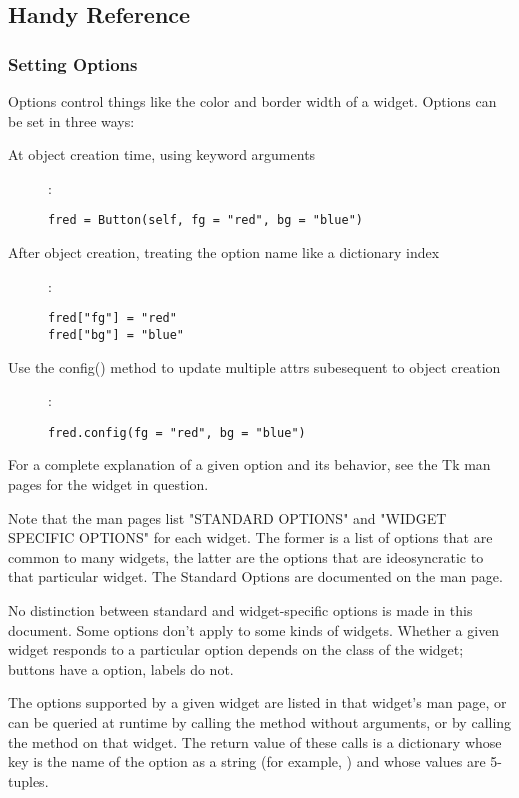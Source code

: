 \subsection{Handy Reference}

\subsubsection{Setting Options
               \label{tkinter-setting-options}}

Options control things like the color and border width of a widget.
Options can be set in three ways:

\begin{description}
\item[At object creation time, using keyword arguments]:
\begin{verbatim}
fred = Button(self, fg = "red", bg = "blue")
\end{verbatim}
\item[After object creation, treating the option name like a dictionary index]:
\begin{verbatim}
fred["fg"] = "red"
fred["bg"] = "blue"
\end{verbatim}
\item[Use the config() method to update multiple attrs subesequent to
object creation]:
\begin{verbatim}
fred.config(fg = "red", bg = "blue")
\end{verbatim}
\end{description}

For a complete explanation of a given option and its behavior, see the
Tk man pages for the widget in question.

Note that the man pages list "STANDARD OPTIONS" and "WIDGET SPECIFIC
OPTIONS" for each widget.  The former is a list of options that are
common to many widgets, the latter are the options that are
ideosyncratic to that particular widget.  The Standard Options are
documented on the  man page.

No distinction between standard and widget-specific options is made in
this document.  Some options don't apply to some kinds of widgets.
Whether a given widget responds to a particular option depends on the
class of the widget; buttons have a  option, labels do not. 

The options supported by a given widget are listed in that widget's
man page, or can be queried at runtime by calling the
 method without arguments, or by calling the
 method on that widget.  The return value of these
calls is a dictionary whose key is the name of the option as a string
(for example, ) and whose values are 5-tuples.

